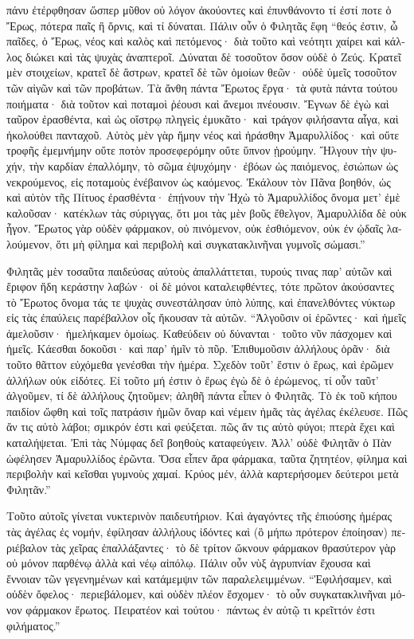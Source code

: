 \documentclass{book}
\begin{document}
\begin{pairs}
\begin{Leftside}
\begin{greek}
  πάνυ ἐτέρφθησαν ὥσπερ μῦθον οὐ λόγον ἀκούοντες καὶ ἐπυνθάνοντο τί ἐστί ποτε ὁ Ἔρως, πότερα παῖς ἢ ὄρνις, καὶ τί δύναται. Πάλιν οὖν ὁ Φιλητᾶς ἔφη “θεός ἐστιν, ὦ παῖδες, ὁ Ἔρως, νέος καὶ καλὸς καὶ πετόμενος· διὰ τοῦτο καὶ νεότητι χαίρει καὶ κάλλος διώκει καὶ τὰς ψυχὰς ἀναπτεροῖ.  Δύναται δὲ τοσοῦτον ὅσον οὐδὲ ὁ Ζεύς. Κρατεῖ μὲν στοιχείων, κρατεῖ δὲ ἄστρων, κρατεῖ δὲ τῶν ὁμοίων θεῶν· οὐδὲ ὑμεῖς τοσοῦτον τῶν αἰγῶν καὶ τῶν προβάτων.  Τὰ ἄνθη πάντα Ἔρωτος ἔργα· τὰ φυτὰ πάντα τούτου ποιήματα· διὰ τοῦτον καὶ ποταμοὶ ῥέουσι καὶ ἄνεμοι πνέουσιν.  Ἔγνων δὲ ἐγὼ καὶ ταῦρον ἐρασθέντα, καὶ ὡς οἴστρῳ πληγεὶς ἐμυκᾶτο· καὶ τράγον φιλήσαντα αἶγα, καὶ ἠκολούθει πανταχοῦ. Αὐτὸς μὲν γὰρ ἤμην νέος καὶ ἠράσθην Ἀμαρυλλίδος· καὶ οὔτε τροφῆς ἐμεμνήμην οὔτε ποτὸν προσεφερόμην οὔτε ὕπνον ᾑρούμην.  Ἤλγουν τὴν ψυχήν, τὴν καρδίαν ἐπαλλόμην, τὸ σῶμα ἐψυχόμην· ἐβόων ὡς παιόμενος, ἐσιώπων ὡς νεκρούμενος, εἰς ποταμοὺς ἐνέβαινον ὡς καόμενος.  Ἐκάλουν τὸν Πᾶνα βοηθόν, ὡς καὶ αὐτὸν τῆς Πίτυος ἐρασθέντα· ἐπῄνουν τὴν Ἠχὼ τὸ Ἀμαρυλλίδος ὄνομα μετ’ ἐμὲ καλοῦσαν· κατέκλων τὰς σύριγγας, ὅτι μοι τὰς μὲν βοῦς ἔθελγον, Ἀμαρυλλίδα δὲ οὐκ ἦγον.  Ἔρωτος γὰρ οὐδὲν φάρμακον, οὐ πινόμενον, οὐκ ἐσθιόμενον, οὐκ ἐν ᾠδαῖς λαλούμενον, ὅτι μὴ φίλημα καὶ περιβολὴ καὶ συγκατακλινῆναι γυμνοῖς σώμασι.”
\pend


  Φιλητᾶς μὲν τοσαῦτα παιδεύσας αὐτοὺς ἀπαλλάττεται, τυρούς τινας παρ’ αὐτῶν καὶ ἔριφον ἤδη κεράστην λαβών· οἱ δὲ μόνοι καταλειφθέντες, τότε πρῶτον ἀκούσαντες τὸ Ἔρωτος ὄνομα τάς τε ψυχὰς συνεστάλησαν ὑπὸ λύπης, καὶ ἐπανελθόντες νύκτωρ εἰς τὰς ἐπαύλεις παρέβαλλον οἷς ἤκουσαν τὰ αὑτῶν.  “Ἀλγοῦσιν οἱ ἐρῶντες· καὶ ἡμεῖς ἀμελοῦσιν· ἠμελήκαμεν ὁμοίως. Καθεύδειν οὐ δύνανται· τοῦτο νῦν πάσχομεν καὶ ἡμεῖς. Κάεσθαι δοκοῦσι· καὶ παρ’ ἡμῖν τὸ πῦρ. Ἐπιθυμοῦσιν ἀλλήλους ὁρᾶν· διὰ τοῦτο θᾶττον εὐχόμεθα γενέσθαι τὴν ἡμέρα.  Σχεδὸν τοῦτ’ ἔστιν ὁ ἔρως, καὶ ἐρῶμεν ἀλλήλων οὐκ εἰδότες. Εἰ τοῦτο μή ἐστιν ὁ ἔρως ἐγὼ δὲ ὁ ἐρώμενος, τί οὖν ταῦτ’ ἀλγοῦμεν, τί δὲ ἀλλήλους ζητοῦμεν; ἀληθῆ πάντα εἶπεν ὁ Φιλητᾶς.  Τὸ ἐκ τοῦ κήπου παιδίον ὤφθη καὶ τοῖς πατράσιν ἡμῶν ὄναρ καὶ νέμειν ἡμᾶς τὰς ἀγέλας ἐκέλευσε. Πῶς ἄν τις αὐτὸ λάβοι; σμικρόν ἐστι καὶ φεύξεται. πῶς ἄν τις αὐτὸ φύγοι; πτερὰ ἔχει καὶ καταλήψεται.  Ἐπὶ τὰς Νύμφας δεῖ βοηθοὺς καταφεύγειν. Ἀλλ’ οὐδὲ Φιλητᾶν ὁ Πὰν ὠφέλησεν Ἀμαρυλλίδος ἐρῶντα. Ὅσα εἶπεν ἄρα φάρμακα, ταῦτα ζητητέον, φίλημα καὶ περιβολὴν καὶ κεῖσθαι γυμνοὺς χαμαί. Κρύος μέν, ἀλλὰ καρτερήσομεν δεύτεροι μετὰ Φιλητᾶν.”
\pend


  Τοῦτο αὐτοῖς γίνεται νυκτερινὸν παιδευτήριον. Καὶ ἀγαγόντες τῆς ἐπιούσης ἡμέρας τὰς ἀγέλας ἐς νομήν, ἐφίλησαν ἀλλήλους ἰδόντες καὶ (ὃ μήπω πρότερον ἐποίησαν) περιέβαλον τὰς χεῖρας ἐπαλλάξαντες· τὸ δὲ τρίτον ὤκνουν φάρμακον θρασύτερον γὰρ οὐ μόνον παρθένῳ ἀλλὰ καὶ νέῳ αἰπόλῳ.  Πάλιν οὖν νὺξ ἀγρυπνίαν ἔχουσα καὶ ἔννοιαν τῶν γεγενημένων καὶ κατάμεμψιν τῶν παραλελειμμένων. “Ἐφιλήσαμεν, καὶ οὐδὲν ὄφελος· περιεβάλομεν, καὶ οὐδὲν πλέον ἔσχομεν· τὸ οὖν συγκατακλινῆναι μόνον φάρμακον ἔρωτος. Πειρατέον καὶ τούτου· πάντως ἐν αὐτῷ τι κρεῖττόν ἐστι φιλήματος.”
\pend



\end{greek}
\end{Leftside}
\end{pairs}
\end{document}
